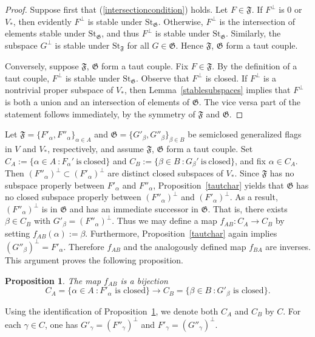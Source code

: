 \documentclass{article}
\newcommand {\St} {\mathrm{St}}
\def\F{\mathfrak{F}}
\def\G{\mathfrak{G}}
\newtheorem{prop}[thm]{Proposition}
\begin{document}
\begin{proof}
Suppose first that (\ref{intersectioncondition}) holds.  Let $F \in \F$.  If $F^\perp$ is $0$ or $V_*$, then evidently $F^\perp$ is stable under $\St_\G$.  Otherwise, $F^\perp$ is the intersection of elements stable under $\St_\G$, and thus $F^\perp$ is stable under $\St_\G$.  Similarly, the subspace $G^\perp$ is stable under $\St_\F$ for all $G \in \G$.  Hence $\F$, $\G$ form a taut couple.

Conversely, suppose $\F$, $\G$ form a taut couple.  Fix $F \in \F$.  
By the definition of a taut couple, $F^\perp$ is stable under $\St_\G$.  Observe that $F^\perp$ is closed.  If $F^\perp$ is a nontrivial proper subspace of $V_*$, then Lemma~\ref{stablesubspaces} implies that $F^\perp$ is both a union and an intersection of elements of $\G$.  The vice versa part of the statement follows immediately, by the symmetry of $\F$ and $\G$. 
\end{proof}


Let $\F = \{F'_\alpha , F''_\alpha \}_{\alpha \in A}$ and $\G= \{G'_\beta, G''_\beta \}_{\beta \in B}$ be semiclosed generalized flags in $V$ and $V_*$, respectively, and assume $\F$, $\G$ form a taut couple.  Set $C_A:=\{\alpha\in A ~\colon F_\alpha' \mathrm{~is~closed}\}$ and $C_B:=\{\beta\in B ~\colon G_\beta' \mathrm{~is~closed}\}$, and fix $\alpha \in C_A$.  Then $(F''_\alpha)^\perp \subset (F'_\alpha)^\perp$ are distinct closed subspaces of $V_*$.  Since $\F$ has no subspace properly between $F'_\alpha$ and $F''_\alpha$, Proposition~\ref{tautchar} yields that $\G$ has no closed subspace properly between $(F''_\alpha)^\perp$ and $(F'_\alpha)^\perp$.  As a result, $(F''_\alpha)^\perp$ is in $\G$ and has an immediate successor in $\G$.  That is, there exists $\beta \in C_B$ with $G'_\beta = (F''_\alpha)^\perp$.  Thus we may define a map $f_{AB} \colon C_A \rightarrow C_B$ by setting $f_{AB} (\alpha) := \beta$.  Furthermore, Proposition~\ref{tautchar} again implies $(G''_\beta)^\perp = F'_\alpha$.  Therefore $f_{AB}$ and the analogously defined map $f_{BA}$ are inverses.   This argument proves the following proposition.


\begin{prop} \label{definec}
The map $f_{AB}$ is a bijection
$$C_A = \{ \alpha \in A ~\colon F'_\alpha \textrm{ is closed} \} \rightarrow C_B = \{ \beta \in B ~\colon G'_\beta \textrm{ is closed} \}.$$
\end{prop}


Using the identification of Proposition~\ref{definec}, we denote both $C_A$ and $C_B$ by $C$.  For each $\gamma \in C$, one has $G'_\gamma = (F''_\gamma)^\perp$ and $F'_\gamma = (G''_\gamma)^\perp$.
\end{document}

